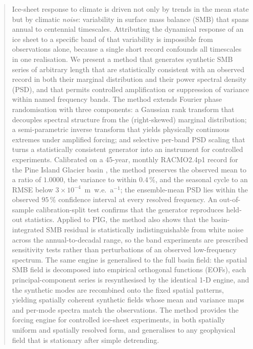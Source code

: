 \begin{abstract}
Ice-sheet response to climate is driven not only by trends in the mean
state but by climatic \emph{noise}: variability in surface mass balance
(SMB) that spans annual to centennial timescales. Attributing the
dynamical response of an ice sheet to a specific band of that variability
is impossible from observations alone, because a single short record
confounds all timescales in one realisation. We present a method that
generates synthetic SMB series of arbitrary length that are statistically
consistent with an observed record in both their marginal distribution and
their power spectral density (PSD), and that permits controlled
amplification or suppression of variance within named frequency bands. The
method extends Fourier phase randomisation \citep{theiler1992,schreiber2000}
with three components: a Gaussian rank transform that decouples spectral
structure from the (right-skewed) marginal distribution; a semi-parametric
inverse transform that yields physically continuous extremes under
amplified forcing; and selective per-band PSD scaling that turns a
statistically consistent generator into an instrument for controlled
experiments. Calibrated on a 45-year, monthly RACMO2.4p1 record for the
Pine Island Glacier basin \citep{vandalum2025}, the method preserves the
observed mean to a ratio of $1.0000$, the variance to within $0.4\,\%$, and
the seasonal cycle to an RMSE below $3\times10^{-4}$~m~w.e.~a$^{-1}$; the
ensemble-mean PSD lies within the observed $95\,\%$ confidence interval at
every resolved frequency. An out-of-sample calibration-split test confirms
that the generator reproduces held-out statistics. Applied to PIG, the method
also shows that the basin-integrated SMB residual is statistically
indistinguishable from white noise across the annual-to-decadal range, so the
band experiments are prescribed sensitivity tests rather than perturbations of
an observed low-frequency spectrum. The same engine is
generalised to the full basin field: the spatial SMB field is decomposed
into empirical orthogonal functions (EOFs), each principal-component series
is resynthesised by the identical 1-D engine, and the synthetic modes are
recombined onto the fixed spatial patterns, yielding spatially coherent
synthetic fields whose mean and variance maps and per-mode spectra match the
observations. The method provides the forcing engine for controlled
ice-sheet experiments, in both spatially uniform and spatially resolved
form, and generalises to any geophysical field that is stationary after
simple detrending.
\end{abstract}


